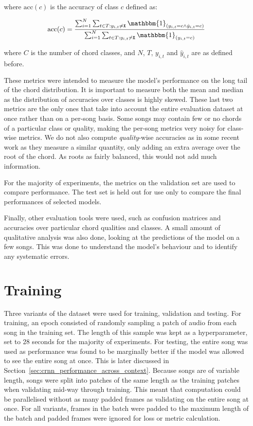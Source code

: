 where $\text{acc}(c)$ is the accuracy of class $c$ defined as:

\[\text{acc}(c) = \frac{\sum_{i=1}^{N} \sum_{t\in T : y_{i,t} \neq \texttt{X}} \mathbbm{1}_{(y_{i,t} = c \land \hat{y}_{i,t} = c)}}{\sum_{i=1}^{N} \sum_{t\in T : y_{i,t} \neq \texttt{X}} \mathbbm{1}_{(y_{i,t} = c)}}\]

where $C$ is the number of chord classes, and $N$, $T$, $y_{i,t}$ and $\hat{y}_{i,t}$ are as defined before.

These metrics were intended to measure the model's performance on the long tail of the chord distribution. It is important to measure both the mean and median as the distribution of accuracies over classes is highly skewed. These last two metrics are the only ones that take into account the entire evaluation dataset at once rather than on a per-song basis. Some songs may contain few or no chords of a particular class or quality, making the per-song metrics very noisy for class-wise metrics. We do not also compute \emph{quality}-wise accuracies as in some recent work as they measure a similar quantity, only adding an extra average over the root of the chord. As roots as fairly balanced, this would not add much information.

For the majority of experiments, the metrics on the validation set are used to compare performance. The test set is held out for use only to compare the final performances of selected models.

Finally, other evaluation tools were used, such as confusion matrices and accuracies over particular chord qualities and classes. A small amount of qualitative analysis was also done, looking at the predictions of the model on a few songs. This was done to understand the model's behaviour and to identify any systematic errors.

\section{Training}\label{sec:training}

Three variants of the dataset were used for training, validation and testing. For training, an epoch consisted of randomly sampling a patch of audio from each song in the training set. The length of this sample was kept as a hyperparameter, set to $28$ seconds for the majority of experiments. For testing, the entire song was used as performance was found to be marginally better if the model was allowed to see the entire song at once. This is later discussed in Section~\ref{sec:crnn_performance_across_context}. Because songs are of variable length, songs were split into patches of the same length as the training patches when validating mid-way through training. This meant that computation could be parallelised without as many padded frames as validating on the entire song at once. For all variants, frames in the batch were padded to the maximum length of the batch and padded frames were ignored for loss or metric calculation.

